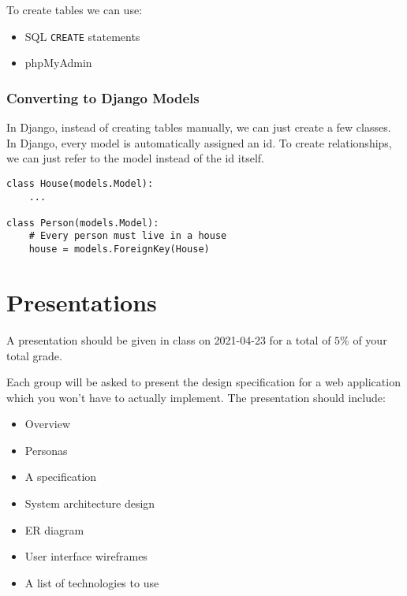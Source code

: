 To create tables we can use:
\begin{itemize}
	\item SQL \texttt{CREATE} statements
	\item phpMyAdmin
\end{itemize}

\subsubsection{Converting to Django Models}\label{ssub:converting_to_django_models}

In Django, instead of creating tables manually, we can just create a few classes.
In Django, every model is automatically assigned an id.
To create relationships, we can just refer to the model instead of the id itself.

\begin{verbatim}
class House(models.Model):
    ...

class Person(models.Model):
    # Every person must live in a house
    house = models.ForeignKey(House)
\end{verbatim}

\section{Presentations}\label{sec:presentations}

A presentation should be given in class on 2021-04-23 for a total of \(5\%\) of your total grade.

Each group will be asked to present the design specification for a web application which you won't have to actually implement.
The presentation should include:
\begin{itemize}
	\item Overview
	\item Personas
	\item A specification
	\item System architecture design
	\item ER diagram
	\item User interface wireframes
	\item A list of technologies to use
\end{itemize}
